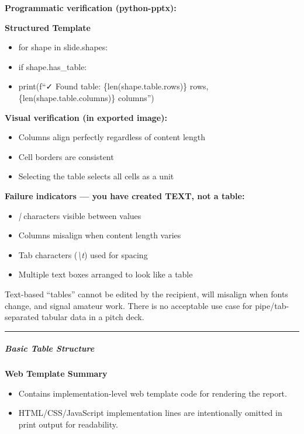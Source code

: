 \documentclass[11pt]{article}
\begin{document}
\textbf{Programmatic verification (python-pptx):}

\textbf{Structured Template}
\begin{itemize}[leftmargin=*,itemsep=2pt,topsep=2pt]
\item {} for shape in slide.shapes:
\item {} if shape.has\_\allowbreak{}table:
\item {} print(f``✓ Found table: \{len(shape.table.rows)\} rows, \{len(shape.table.columns)\} columns'')
\end{itemize}

\textbf{Visual verification (in exported image):}

\begin{itemize}[leftmargin=*,itemsep=2pt,topsep=2pt]
\item {} Columns align perfectly regardless of content length
\item {} Cell borders are consistent
\item {} Selecting the table selects all cells as a unit
\end{itemize}

\textbf{Failure indicators — you have created TEXT, not a table:}

\begin{itemize}[leftmargin=*,itemsep=2pt,topsep=2pt]
\item {} \emph{|} characters visible between values
\item {} Columns misalign when content length varies
\item {} Tab characters (\emph{\textbackslash{}t}) used for spacing
\item {} Multiple text boxes arranged to look like a table
\end{itemize}

Text-based ``tables'' cannot be edited by the recipient, will misalign when fonts change, and signal amateur work. There is no acceptable use case for pipe/tab-separated tabular data in a pitch deck.


\vspace{0.5em}\hrule\vspace{0.5em}

\subparagraph{Basic Table Structure}\mbox{}\par

\textbf{Web Template Summary}
\begin{itemize}[leftmargin=*,itemsep=2pt,topsep=2pt]
\item {} Contains implementation-level web template code for rendering the report.
\item {} HTML/CSS/JavaScript implementation lines are intentionally omitted in print output for readability.
\end{itemize}
\end{document}
